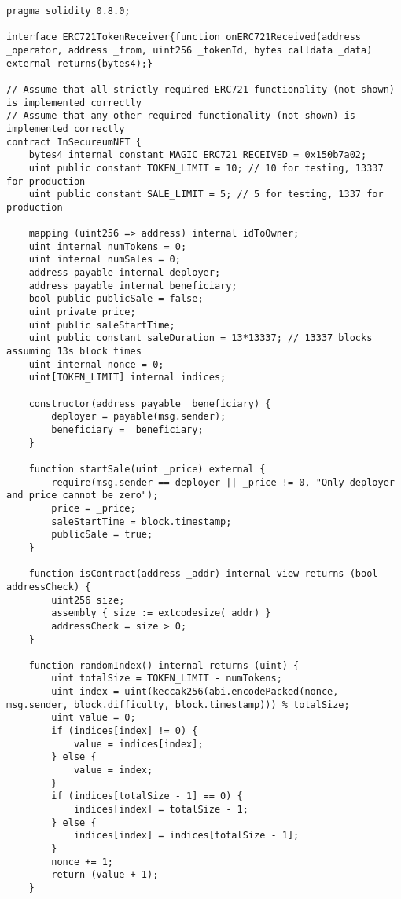\begin{lstlisting}[language=Solidity, style=solStyle]
pragma solidity 0.8.0;

interface ERC721TokenReceiver{function onERC721Received(address _operator, address _from, uint256 _tokenId, bytes calldata _data) external returns(bytes4);}

// Assume that all strictly required ERC721 functionality (not shown) is implemented correctly
// Assume that any other required functionality (not shown) is implemented correctly
contract InSecureumNFT {
    bytes4 internal constant MAGIC_ERC721_RECEIVED = 0x150b7a02;
    uint public constant TOKEN_LIMIT = 10; // 10 for testing, 13337 for production
    uint public constant SALE_LIMIT = 5; // 5 for testing, 1337 for production

    mapping (uint256 => address) internal idToOwner;
    uint internal numTokens = 0;
    uint internal numSales = 0;
    address payable internal deployer;
    address payable internal beneficiary;
    bool public publicSale = false;
    uint private price;
    uint public saleStartTime;
    uint public constant saleDuration = 13*13337; // 13337 blocks assuming 13s block times 
    uint internal nonce = 0;
    uint[TOKEN_LIMIT] internal indices;
 
    constructor(address payable _beneficiary) {
        deployer = payable(msg.sender);
        beneficiary = _beneficiary;
    }

    function startSale(uint _price) external {
        require(msg.sender == deployer || _price != 0, "Only deployer and price cannot be zero");
        price = _price;
        saleStartTime = block.timestamp;
        publicSale = true;
    }

    function isContract(address _addr) internal view returns (bool addressCheck) {
        uint256 size;
        assembly { size := extcodesize(_addr) }
        addressCheck = size > 0;
    }

    function randomIndex() internal returns (uint) {
        uint totalSize = TOKEN_LIMIT - numTokens;
        uint index = uint(keccak256(abi.encodePacked(nonce, msg.sender, block.difficulty, block.timestamp))) % totalSize;
        uint value = 0;
        if (indices[index] != 0) {
            value = indices[index];
        } else {
            value = index;
        }
        if (indices[totalSize - 1] == 0) {
            indices[index] = totalSize - 1;
        } else {
            indices[index] = indices[totalSize - 1];
        }
        nonce += 1;
        return (value + 1);
    }


\end{lstlisting}
